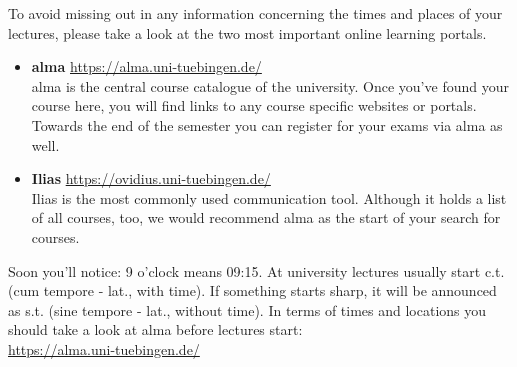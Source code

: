 
To avoid missing out in any information concerning the times and places of your lectures, please take a look at the two most important online learning portals.
\begin{itemize}
	\item \textbf{alma} \url{https://alma.uni-tuebingen.de/} \\
	alma is the central course catalogue of the university. Once you've found your course here, you will find links to any course specific websites or portals.
	Towards the end of the semester you can register for your exams via alma as well. 
	\item \textbf{Ilias} \url{https://ovidius.uni-tuebingen.de/} \\
	Ilias is the most commonly used communication tool. Although it holds a list of all courses, too, we would recommend alma as the start of your search for courses.
\end{itemize}

Soon you'll notice: 9 o'clock means 09:15. At university lectures usually start c.t. (cum
tempore - lat., with time). If something starts \glqq sharp\grqq, it will be announced as s.t. (sine tempore - lat., without
time). In terms of times and locations you should take a look at alma before lectures start:\\
\url{https://alma.uni-tuebingen.de/}
